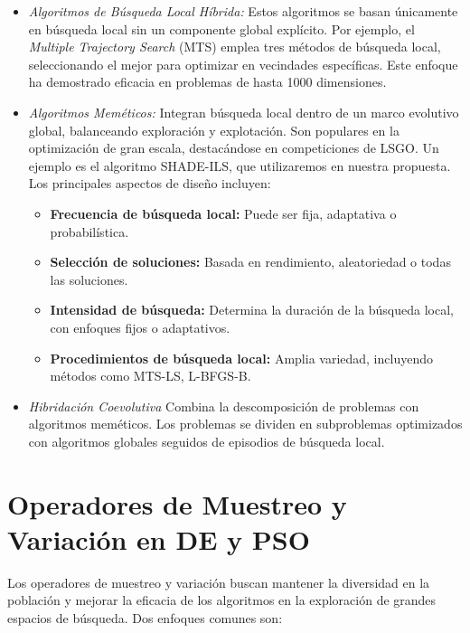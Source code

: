 \begin{itemize}
\item \textit{Algoritmos de Búsqueda Local Híbrida:}
Estos algoritmos se basan únicamente en búsqueda local sin un componente global explícito. Por ejemplo, el \textit{Multiple Trajectory Search} (MTS) emplea tres métodos de búsqueda local, seleccionando el mejor para optimizar en vecindades específicas. Este enfoque ha demostrado eficacia en problemas de hasta 1000 dimensiones.

\item \textit{Algoritmos Meméticos:}
Integran búsqueda local dentro de un marco evolutivo global, balanceando exploración y explotación. Son populares en la optimización de gran escala, destacándose en competiciones de LSGO. Un ejemplo es el algoritmo SHADE-ILS, que utilizaremos en nuestra propuesta. Los principales aspectos de diseño incluyen:
\begin{itemize}
    \item \textbf{Frecuencia de búsqueda local:} Puede ser fija, adaptativa o probabilística.
    \item \textbf{Selección de soluciones:} Basada en rendimiento, aleatoriedad o todas las soluciones.
    \item \textbf{Intensidad de búsqueda:} Determina la duración de la búsqueda local, con enfoques fijos o adaptativos.
    \item \textbf{Procedimientos de búsqueda local:} Amplia variedad, incluyendo métodos como MTS-LS, L-BFGS-B.
\end{itemize}

\item \textit{Hibridación Coevolutiva}
Combina la descomposición de problemas con algoritmos meméticos. Los problemas se dividen en subproblemas optimizados con algoritmos globales seguidos de episodios de búsqueda local. 
\end{itemize}

\section{Operadores de Muestreo y Variación en DE y PSO}

Los operadores de muestreo y variación buscan mantener la diversidad en la población y mejorar la eficacia de los algoritmos en la exploración de grandes espacios de búsqueda. Dos enfoques comunes son:

